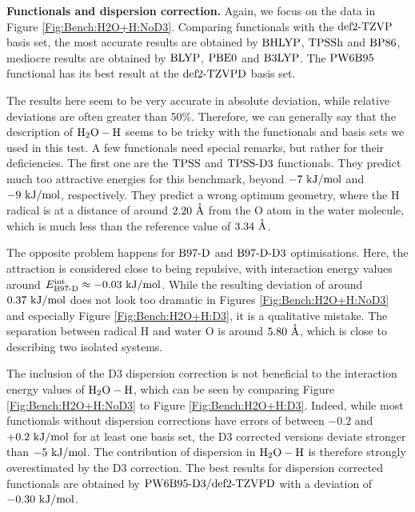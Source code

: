 \documentclass[8.5pt,twoside,twocolumn]{article}
\newcommand\eint{\enmat{E^{\te{int}}}}
\renewcommand{\Ang}{\mathring{\te{A}}}
\newcommand\kmo{\enmat{\te {kJ/mol}}}
\theoremstyle{standard}
\begin{document}
\textbf{Functionals and dispersion correction.} Again, we focus on the data in
Figure \ref{Fig:Bench:H2O+H:NoD3}. Comparing functionals with the $\text{def2-TZVP}$ basis set,
the most accurate results are obtained by $\text{BHLYP}$, $\text{TPSSh}$ and $\text{BP86}$, mediocre
results are obtained by $\text{BLYP}$, $\text{PBE0}$ and $\text{B3LYP}$. The $\text{PW6B95}$ functional
has its best result at the $\text{def2-TZVPD}$ basis set.

The results here seem to be very accurate in
absolute deviation, while relative deviations are often greater than 50\%.
Therefore, we can generally say that the description of $\mbox{\ensuremath{\text H _2 \text O-\text H}}$ seems to be
tricky with the functionals and basis sets we used in this test. 
A few functionals need special remarks, but rather for their deficiencies. The
first one are the $\text{TPSS}$ and $\text{TPSS}\text{-D3}$ functionals. They predict much too
attractive energies for this benchmark, beyond $-7\ \kmo$ and $-9\ \kmo$,
respectively.
They predict
a wrong optimum geometry, where the H radical is at a distance of around $2.20\ \Ang$
from the O atom in the water molecule, which is much less than the reference
value of $3.34\ \Ang$. 

The opposite problem happens for $\text{B97-D}$ and $\text{B97-D}\text{-D3}$ optimisations. Here, the attraction is
considered close to being repulsive, with interaction energy values around
\mbox{$\eint_{\bns}\approx -0.03\ \kmo$}. While the resulting deviation of around
$0.37\ \kmo$ does not look too dramatic in Figures \ref{Fig:Bench:H2O+H:NoD3} and
especially Figure \ref{Fig:Bench:H2O+H:D3}, it is a qualitative mistake. The
separation between radical H and water O is around $5.80\ \Ang$, which is close to describing two isolated
systems.

The inclusion of the D3 dispersion correction is
not beneficial to the interaction energy values of $\mbox{\ensuremath{\text H _2 \text O-\text H}}$, which can be seen
by comparing Figure \ref{Fig:Bench:H2O+H:NoD3} to Figure
\ref{Fig:Bench:H2O+H:D3}. Indeed, while most functionals without dispersion
corrections have errors of between $-0.2$ and $+0.2\ \kmo$ for at least one
basis set, the D3 corrected versions deviate stronger than $-5\ \kmo$.
The contribution of dispersion in $\mbox{\ensuremath{\text H _2 \text O-\text H}}$ is therefore strongly overestimated
by the D3 correction. The best results for dispersion corrected functionals are
obtained by $\text{PW6B95}\text{-D3}/\text{def2-TZVPD}$ with a deviation of $-0.30\ \kmo$.
\end{document}
